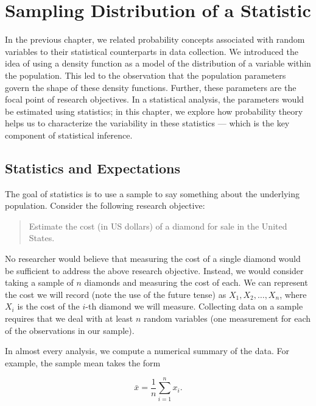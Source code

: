 \documentclass[
  letterpaper,
  DIV=11,
  numbers=noendperiod]{scrreprt}
\theoremstyle{definition}
\theoremstyle{definition}
\theoremstyle{plain}
\theoremstyle{remark}
\begin{document}

\hypertarget{sec-samplingdistributions}{%
\chapter{Sampling Distribution of a
Statistic}\label{sec-samplingdistributions}}

In the previous chapter, we related probability concepts associated with
random variables to their statistical counterparts in data collection.
We introduced the idea of using a density function as a model of the
distribution of a variable within the population. This led to the
observation that the population parameters govern the shape of these
density functions. Further, these parameters are the focal point of
research objectives. In a statistical analysis, the parameters would be
estimated using statistics; in this chapter, we explore how probability
theory helps us to characterize the variability in these statistics ---
which is the key component of statistical inference.

\hypertarget{statistics-and-expectations}{%
\section{Statistics and
Expectations}\label{statistics-and-expectations}}

The goal of statistics is to use a sample to say something about the
underlying population. Consider the following research objective:

\begin{quote}
Estimate the cost (in US dollars) of a diamond for sale in the United
States.
\end{quote}

No researcher would believe that measuring the cost of a single diamond
would be sufficient to address the above research objective. Instead, we
would consider taking a sample of \(n\) diamonds and measuring the cost
of each. We can represent the cost we will record (note the use of the
future tense) as \(X_1, X_2, \dotsc, X_n\), where \(X_i\) is the cost of
the \(i\)-th diamond we will measure. Collecting data on a sample
requires that we deal with at least \(n\) random variables (one
measurement for each of the observations in our sample).

In almost every analysis, we compute a numerical summary of the data.
For example, the sample mean takes the form

\[\bar{x} = \frac{1}{n} \sum_{i=1}^{n} x_i.\]
\end{document}
